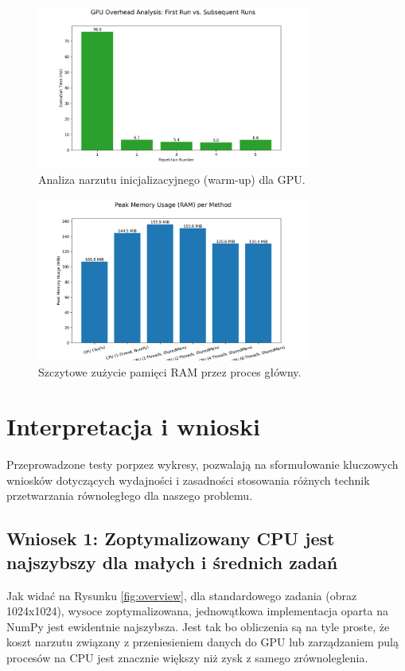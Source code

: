 \documentclass[12pt,a4paper]{article}
\begin{document}
\begin{figure}[H]
    \centering
    \includegraphics[width=0.8\textwidth]{charts/05_gpu_overhead.png}
    \caption{Analiza narzutu inicjalizacyjnego (warm-up) dla GPU.}
    \label{fig:gpu_overhead}
\end{figure}

\begin{figure}[H]
    \centering
    \includegraphics[width=0.8\textwidth]{charts/06_memory_usage.png}
    \caption{Szczytowe zużycie pamięci RAM przez proces główny.}
    \label{fig:memory}
\end{figure}

\newpage

\section{Interpretacja i wnioski}
Przeprowadzone testy porpzez wykresy, pozwalają na sformułowanie kluczowych wniosków dotyczących wydajności i zasadności stosowania różnych technik przetwarzania równoległego dla naszego problemu.

\subsection{Wniosek 1: Zoptymalizowany CPU jest najszybszy dla małych i średnich zadań}
Jak widać na Rysunku \ref{fig:overview}, dla standardowego zadania (obraz 1024x1024), wysoce zoptymalizowana, jednowątkowa implementacja oparta na NumPy jest ewidentnie najszybsza. Jest tak bo obliczenia są na tyle proste, że koszt narzutu związany z przeniesieniem danych do GPU lub zarządzaniem pulą procesów na CPU jest znacznie większy niż zysk z samego zrównoleglenia.
\end{document}
